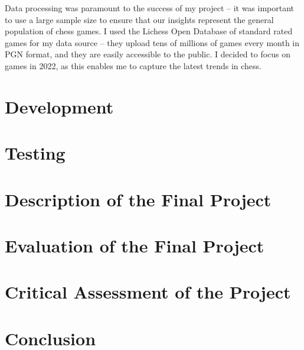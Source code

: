 \documentclass[a4paper, 11pt]{article}
\begin{document}
Data processing was paramount to the success of my project -- it was important to use a large sample size to ensure that our insights represent the general population of chess games. I used the Lichess Open Database of standard rated games for my data source -- they upload tens of millions of games every month in PGN format, and they are easily accessible to the public. I decided to focus on games in 2022, as this enables me to capture the latest trends in chess.

\section{Development}

\section{Testing}

\section{Description of the Final Project}

\section{Evaluation of the Final Project}

\section{Critical Assessment of the Project}

\section{Conclusion}



\end{document}

